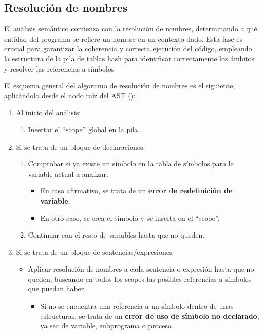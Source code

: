 \subsection{Resolución de nombres}
El análisis semántico comienza con la resolución de nombres, determinando a qué entidad del programa se refiere un nombre en un contexto dado. Esta fase es crucial para garantizar la coherencia y correcta ejecución del código, empleando la estructura de la pila de tablas hash para identificar correctamente los ámbitos y resolver las referencias a símbolos

El esquema general del algoritmo de resolución de nombres es el siguiente, aplicándolo desde el nodo raíz del AST ():
\begin{enumerate}
    \item Al inicio del análisis:
    \begin{enumerate}
        \item Insertar el ``scope'' global en la pila.
    \end{enumerate}
    \item Si se trata de un bloque de declaraciones:
    \begin{enumerate}
        \item Comprobar si ya existe un símbolo en la tabla de símbolos para la variable actual a analizar.
        \begin{itemize}
            \item En caso afirmativo, se trata de un \textbf{error de redefinición de variable}.
            \item En otro caso, se crea el símbolo y se inserta en el ``scope''.
        \end{itemize}
        \item Continuar con el resto de variables hasta que no queden.
    \end{enumerate}
    \item Si se trata de un bloque de sentencias/expresiones:
    \begin{itemize}
        \item Aplicar resolución de nombres a cada sentencia o expresión hasta que no queden, buscando en todos los scopes las posibles referencias a símbolos que puedan haber.
        \begin{itemize}
            \item Si no se encuentra una referencia a un símbolo dentro de unas estructuras, se trata de un \textbf{error de uso de símbolo no declarado}, ya sea de variable, subprograma o proceso.

\end{itemize}
\end{itemize}
\end{enumerate}
